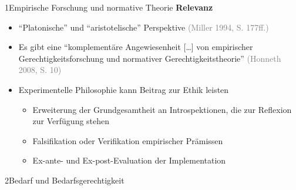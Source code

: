 \documentclass[xcolor=table,9pt,aspectratio=169]{beamer}
\begin{document}
\begin{frame}{\vspace*{10mm}1\hspace*{1em}Empirische Forschung und normative Theorie}
\textbf{Relevanz}\\
\medskip
\begin{itemize}
   \item \enquote{Platonische} und \enquote{aristotelische} Perspektive \textcolor{gray}{(Miller 1994, S. 177ff.)}
   \item Es gibt eine \enquote{komplementäre Angewiesenheit [\ldots] von empirischer Gerechtigkeitsforschung und normativer Gerechtigkeitstheorie} \textcolor{gray}{(Honneth 2008, S. 10)}
   \item Experimentelle Philosophie kann Beitrag zur Ethik leisten
   \begin{itemize}
      \item Erweiterung der Grundgesamtheit an Introspektionen, die zur Reflexion zur Verfügung stehen
      \item Falsifikation oder Verifikation empirischer Prämissen
      \item Ex-ante- und Ex-post-Evaluation der Implementation
   \end{itemize}
\end{itemize}
\end{frame}


\begin{frame}
\begin{overlayarea}{\textwidth}{0.81\paperheight}{
   \vspace*{11mm}
   \textcolor{uolblue}
   {2\hspace*{1em}Bedarf und Bedarfsgerechtigkeit}
}
\end{overlayarea}
\end{frame}
\end{document}
